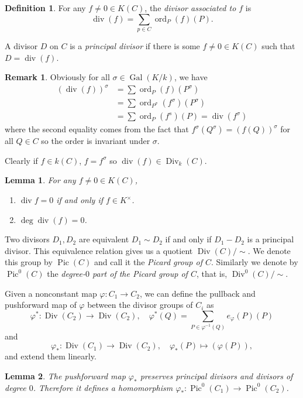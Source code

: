 \documentclass[12pt]{article}
\newtheorem{lemma}{Lemma}[subsection]
\theoremstyle{remark}
\theoremstyle{definition}
\newtheorem{remark}{Remark}[subsection]
\newtheorem{definition}{Definition}[subsection]
\newcommand{\ord}[0]{\operatorname{ord}}
\newcommand{\s}[0]{\sigma}
\newcommand{\Gal}[0]{\operatorname{Gal}}
\newcommand{\Div}[0]{\operatorname{Div}}
\newcommand{\pdiv}[0]{\operatorname{div}}
\newcommand{\Pic}[0]{\operatorname{Pic}}
\begin{document}
        \begin{definition}
            For any $f\neq 0\in K(C)$, the \textit{divisor associated to $f$} is
            \[\pdiv(f)=\sum_{p\in C}\ord_P(f)(P).\]
            
            A divisor $D$ on $C$ is a \textit{principal divisor} if there is some $f\neq 0\in K(C)$ such that $D=\pdiv(f)$.
        \end{definition}
        \begin{remark}
            Obviously for all $\s\in\Gal(K/k)$, we have
            \begin{align*}
                (\pdiv(f))^\s&=\sum \ord_P(f)(P^\s)\\
                &=\sum\ord_{P^\s}(f^\s)(P^\s)\\
                &=\sum \ord_P(f^s)(P)=\pdiv(f^\s)
            \end{align*}
            where the second equality comes from the fact that $f^\s(Q^\s)=(f(Q))^\s$ for all $Q\in C$ so the order is invariant under $\s$.
            
            Clearly if $f\in k(C)$, $f=f^\s$ so $\pdiv(f)\in\Div_k(C)$.
        \end{remark}
        \begin{lemma}\label{lemma-deg-div}
            For any $f\neq 0\in K(C)$,
            \begin{enumerate}[\normalfont(i)]
                \item $\pdiv f=0$ if and only if $f\in K^\times$.
                \item $\deg\pdiv(f)=0$.
            \end{enumerate}
        \end{lemma}
        Two divisors $D_1, D_2$ are equivalent $D_1\sim D_2$ if and only if $D_1-D_2$ is a principal divisor. This equivalence relation gives us a quotient $\Div(C)/\sim$. We denote this group by $\Pic(C)$ and call it the \textit{Picard group of $C$}. Similarly we denote by $\Pic^0(C)$ the \textit{degree-$0$ part of the Picard group of $C$}, that is, $\Div^0(C)/\sim$.
        
        Given a nonconstant map $\varphi:C_1\to C_2$, we can define the pullback and pushforward map of $\varphi$ between the divisor groups of $C_i$ as
        \[\varphi^*:\Div(C_2)\to\Div(C_2),\quad\varphi^*(Q)=\sum_{P\in\varphi^{-1}(Q)}e_\varphi(P)(P)\]
        and
        \[\varphi_*:\Div(C_1)\to\Div(C_2),\quad\varphi_*(P)\mapsto (\varphi(P)),\]
        and extend them linearly.
        \begin{lemma}\label{lemma-pushforward-hom}
            The pushforward map $\varphi_*$ preserves principal divisors and divisors of degree $0$. Therefore it defines a homomorphism $\varphi_*:\Pic^0(C_1)\to\Pic^0(C_2)$.
        \end{lemma}
        
\end{document}

